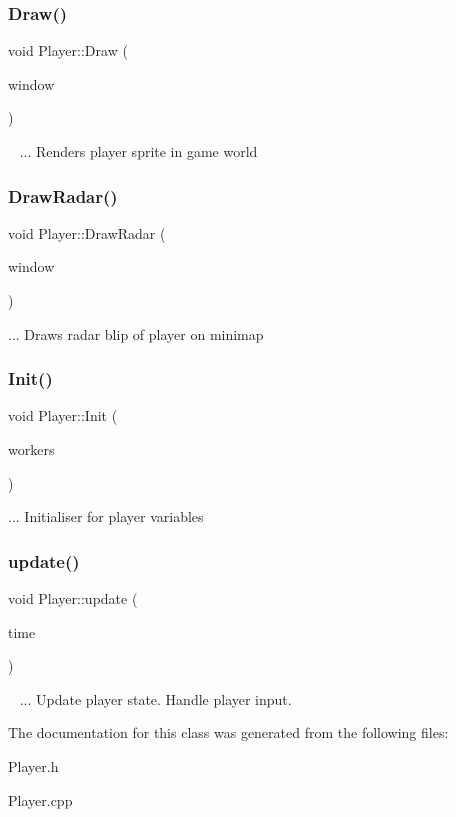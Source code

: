 \subsubsection{\texorpdfstring{Draw()}{Draw()}}
{\footnotesize\ttfamily void Player\+::\+Draw (\begin{DoxyParamCaption}\item[{sf\+::\+Render\+Window \&}]{window }\end{DoxyParamCaption})}

~\newline
... Renders player sprite in game world\mbox{\label{class_player_ac91387d54e20b6e9286c2e2ecba5afc7}} 
\subsubsection{\texorpdfstring{Draw\+Radar()}{DrawRadar()}}
{\footnotesize\ttfamily void Player\+::\+Draw\+Radar (\begin{DoxyParamCaption}\item[{sf\+::\+Render\+Window \&}]{window }\end{DoxyParamCaption})}

... Draws radar blip of player on minimap\mbox{\label{class_player_adc476f05d1e17ce5f8aaa8a60432b3d4}} 
\subsubsection{\texorpdfstring{Init()}{Init()}}
{\footnotesize\ttfamily void Player\+::\+Init (\begin{DoxyParamCaption}\item[{std\+::vector$<$ \mbox{\hyperlink{class_worker}{Worker}} $\ast$$>$}]{workers }\end{DoxyParamCaption})}

... Initialiser for player variables\mbox{\label{class_player_a194b7082791d882887071d8d2893c5e4}} 
\subsubsection{\texorpdfstring{update()}{update()}}
{\footnotesize\ttfamily void Player\+::update (\begin{DoxyParamCaption}\item[{float}]{time }\end{DoxyParamCaption})}

~\newline
... Update player state. Handle player input.

The documentation for this class was generated from the following files\+:\begin{DoxyCompactItemize}
\item 
Player.\+h\item 
Player.\+cpp\end{DoxyCompactItemize}
